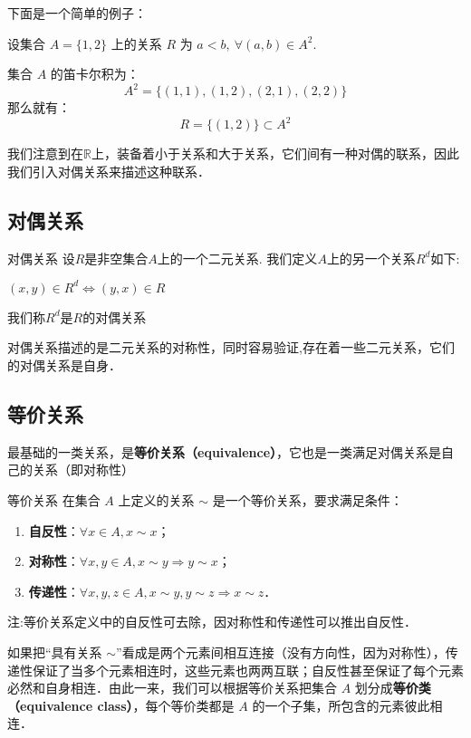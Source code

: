 下面是一个简单的例子：

\begin{example}{}
设集合 $A=\{1,2\}$ 上的关系 $R$ 为 $a<b,\ \forall (a,b)\in A^2$.

集合 $A$ 的笛卡尔积为：
\begin{equation}
A^2 = \{(1,1),(1,2),(2,1),(2,2)\}
\end{equation}
那么就有：
\begin{equation}
R=\{(1,2)\}\subset A^2
\end{equation}

\end{example}

我们注意到在$\mathbb{R}$上，装备着小于关系和大于关系，它们间有一种对偶的联系，因此我们引入对偶关系来描述这种联系．

\subsection{对偶关系}
\begin{definition}{对偶关系}
设$R$是非空集合$A$上的一个二元关系. 我们定义$A$上的另一个关系$R^{d}$如下:

$(x, y) \in R^{d} \Leftrightarrow(y, x) \in R$

我们称$R^{d}$是$R$的对偶关系

\end{definition}
对偶关系描述的是二元关系的对称性，同时容易验证,存在着一些二元关系，它们的对偶关系是自身．

\subsection{等价关系}\label{Relat_sub1}
最基础的一类关系，是\textbf{等价关系（equivalence）}，它也是一类满足对偶关系是自己的关系（即对称性） 
\begin{definition}{等价关系}
在集合 $A$ 上定义的关系 $\sim$ 是一个等价关系，要求满足条件：
\begin{enumerate}
\item \textbf{自反性}：$\forall x\in A, x\sim x$；
\item \textbf{对称性}：$\forall x, y\in A, x\sim y \Rightarrow y\sim x$；
\item \textbf{传递性}：$\forall x, y, z\in A, x\sim y, y\sim z\Rightarrow x\sim z$．
\end{enumerate}
注:等价关系定义中的自反性可去除，因对称性和传递性可以推出自反性．
\end{definition}
如果把“具有关系 $\sim$”看成是两个元素间相互连接（没有方向性，因为对称性），传递性保证了当多个元素相连时，这些元素也两两互联；自反性甚至保证了每个元素必然和自身相连．由此一来，我们可以根据等价关系把集合 $A$ 划分成\textbf{等价类（equivalence class）}，每个等价类都是 $A$ 的一个子集，所包含的元素彼此相连．

